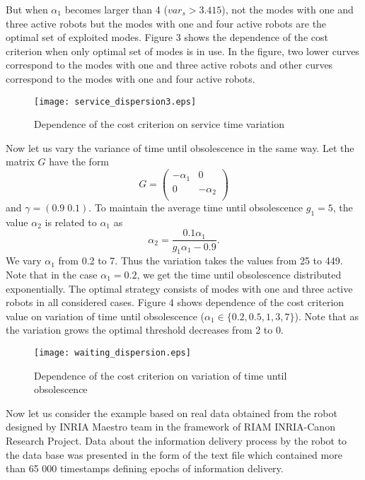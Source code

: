 \documentclass[11pt]{article}
\begin{document}
But when $\alpha_1$ becomes larger than 4 ($var_s>3.415$), not the
modes with one and three active robots  but the modes with one and
four active robots are the optimal set of exploited modes. Figure 3
shows the dependence of the cost criterion when only optimal set of
modes is in use. In the figure, two lower curves correspond to the
modes with one and three active robots and other curves correspond
to the modes with one and four active robots.

\begin{figure}[htb]
\centering \texttt{[image: service\_dispersion3.eps]}\\
  \caption{Dependence of the cost criterion on service time variation}
\end{figure}

Now let us vary the variance of time until obsolescence in the same
way. Let the matrix $G$ have the form
$$G=\begin{pmatrix}
  -\alpha_1 & 0 \\
  0 & -\alpha_2 \\
\end{pmatrix}$$
and $\gamma = (0.9\; 0.1).$ To maintain the average time until
obsolescence $g_1=5$, the value $\alpha_2$ is related to $\alpha_1$
as
$$\alpha_2 = \frac{0.1\alpha_1}{g_1\alpha_1-0.9}.$$
We vary $\alpha_1$ from 0.2 to 7. Thus the variation takes the
values from 25 to 449. Note that in the case $\alpha_1=0.2$, we get
the time until obsolescence distributed exponentially. The optimal
strategy consists of modes with one and three active robots in all
considered cases. Figure 4 shows dependence of the cost criterion
value on variation of time until obsolescence ($\alpha_1\in\{0.2,
0.5,1,3,7\}$). Note that as the variation grows the optimal
threshold decreases from 2 to 0.

\begin{figure}[htb]
\centering \texttt{[image: waiting\_dispersion.eps]}\\
  \caption{Dependence of the cost criterion on variation of time
until obsolescence}\label{fig:3.3}
\end{figure}

Now let us consider the example based on real data obtained from
the robot designed by INRIA Maestro team in the framework of RIAM
INRIA-Canon Research Project. Data about the information
delivery process by the robot to the data base was presented
in the form of the text file which contained more than 65 000
timestamps defining epochs of information delivery.
\end{document}
